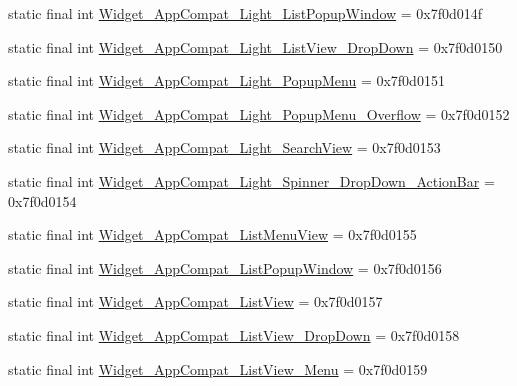 \begin{DoxyCompactItemize}
static final int \mbox{\hyperlink{classcom_1_1synnapps_1_1carouselview_1_1_r_1_1style_a0687d51ed9a645919dc10a7d4415201a}{Widget\+\_\+\+App\+Compat\+\_\+\+Light\+\_\+\+List\+Popup\+Window}} = 0x7f0d014f
\item 
static final int \mbox{\hyperlink{classcom_1_1synnapps_1_1carouselview_1_1_r_1_1style_a58044df22603c57e60cf88157bc29489}{Widget\+\_\+\+App\+Compat\+\_\+\+Light\+\_\+\+List\+View\+\_\+\+Drop\+Down}} = 0x7f0d0150
\item 
static final int \mbox{\hyperlink{classcom_1_1synnapps_1_1carouselview_1_1_r_1_1style_a9418687be37c7664c7ad9d1f49652fb7}{Widget\+\_\+\+App\+Compat\+\_\+\+Light\+\_\+\+Popup\+Menu}} = 0x7f0d0151
\item 
static final int \mbox{\hyperlink{classcom_1_1synnapps_1_1carouselview_1_1_r_1_1style_ac934e3be4a1b142d2372dc0b7746c790}{Widget\+\_\+\+App\+Compat\+\_\+\+Light\+\_\+\+Popup\+Menu\+\_\+\+Overflow}} = 0x7f0d0152
\item 
static final int \mbox{\hyperlink{classcom_1_1synnapps_1_1carouselview_1_1_r_1_1style_a153053fbb9a857367a40fa40ad24d9a7}{Widget\+\_\+\+App\+Compat\+\_\+\+Light\+\_\+\+Search\+View}} = 0x7f0d0153
\item 
static final int \mbox{\hyperlink{classcom_1_1synnapps_1_1carouselview_1_1_r_1_1style_a9f9e7e3a199219dc9f695bad51d74c52}{Widget\+\_\+\+App\+Compat\+\_\+\+Light\+\_\+\+Spinner\+\_\+\+Drop\+Down\+\_\+\+Action\+Bar}} = 0x7f0d0154
\item 
static final int \mbox{\hyperlink{classcom_1_1synnapps_1_1carouselview_1_1_r_1_1style_a02f58435ceb8aaf37cf9d37256c67b9e}{Widget\+\_\+\+App\+Compat\+\_\+\+List\+Menu\+View}} = 0x7f0d0155
\item 
static final int \mbox{\hyperlink{classcom_1_1synnapps_1_1carouselview_1_1_r_1_1style_a06faa0c9a5aa23beebddd54afe92f34d}{Widget\+\_\+\+App\+Compat\+\_\+\+List\+Popup\+Window}} = 0x7f0d0156
\item 
static final int \mbox{\hyperlink{classcom_1_1synnapps_1_1carouselview_1_1_r_1_1style_aa9cf87cb43958bcc2d59d8c2bba2bd45}{Widget\+\_\+\+App\+Compat\+\_\+\+List\+View}} = 0x7f0d0157
\item 
static final int \mbox{\hyperlink{classcom_1_1synnapps_1_1carouselview_1_1_r_1_1style_a390a02a4b28fa4707156c1dac5bf8e38}{Widget\+\_\+\+App\+Compat\+\_\+\+List\+View\+\_\+\+Drop\+Down}} = 0x7f0d0158
\item 
static final int \mbox{\hyperlink{classcom_1_1synnapps_1_1carouselview_1_1_r_1_1style_af1f86aba3ae7f404eee0168c7e2db009}{Widget\+\_\+\+App\+Compat\+\_\+\+List\+View\+\_\+\+Menu}} = 0x7f0d0159

\end{DoxyCompactItemize}
